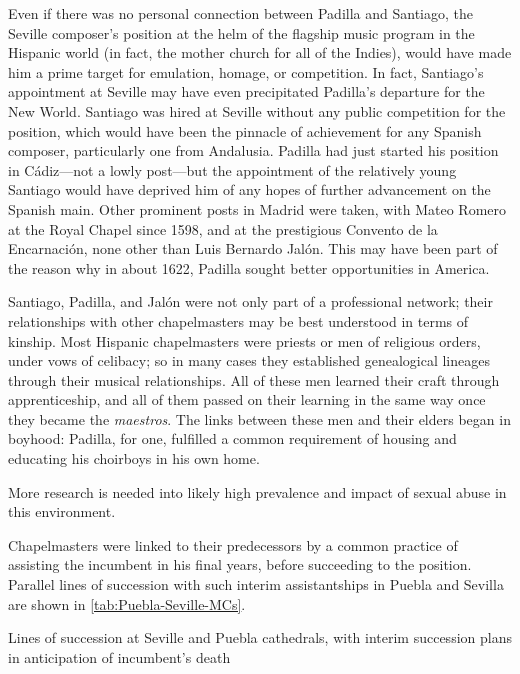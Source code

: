 Even if there was no personal connection between Padilla and Santiago, the
Seville composer's position at the helm of the flagship music program in the
Hispanic world (in fact, the mother church for all of the Indies), would have
made him a prime target for emulation, homage, or competition.
In fact, Santiago's appointment at Seville may have even precipitated Padilla's
departure for the New World.
Santiago was hired at Seville without any public competition for the position,
which would have been the pinnacle of achievement for any Spanish composer,
particularly one from Andalusia.
Padilla had just started his position in Cádiz---not a lowly post---but the
appointment of the relatively young Santiago would have deprived him of any
hopes of further advancement on the Spanish main.
Other prominent posts in Madrid were taken, with Mateo Romero at the Royal
Chapel since 1598, and at the prestigious Convento de la Encarnación, none other
than Luis Bernardo Jalón.%
    \Autocite{Ezquerro:JalonLB} 
This may have been part of the reason why in about 1622, Padilla sought better
opportunities in America.

Santiago, Padilla, and Jalón were not only part of a professional network; their
relationships with other chapelmasters may be best understood in terms of
kinship.
Most Hispanic chapelmasters were priests or men of religious orders, under vows
of celibacy; so in many cases they established genealogical lineages through
their musical relationships.
All of these men learned their craft through apprenticeship, and all of them
passed on their learning in the same way once they became the \emph{maestros}.
The links between these men and their elders began in boyhood: Padilla, for one,
fulfilled a common requirement of housing and educating his choirboys in his own
home.%
\begin{Footnote} 
    More research is needed into likely high prevalence and impact of sexual
    abuse in this environment.
\end{Footnote}
Chapelmasters were linked to their predecessors by a common practice of
assisting the incumbent in his final years, before succeeding to the position.
Parallel lines of succession with such interim assistantships in Puebla and
Sevilla are shown in \cref{tab:Puebla-Seville-MCs}.

\begin{table}
    \caption{Lines of succession at Seville and Puebla cathedrals, with interim
    succession plans in anticipation of incumbent's death}
  
    \label{tab:Puebla-Seville-MCs}
\end{table}

